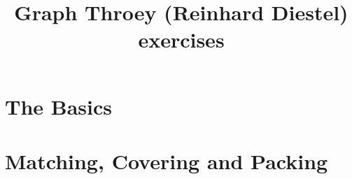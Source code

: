 \documentclass[dvipdfmx]{jarticle}
\title{Graph Throey (Reinhard Diestel) exercises}
\begin{document}
\maketitle

\section{The Basics}


















































\newpage

\section{Matching, Covering and Packing}






































\newpage
\end{document}
